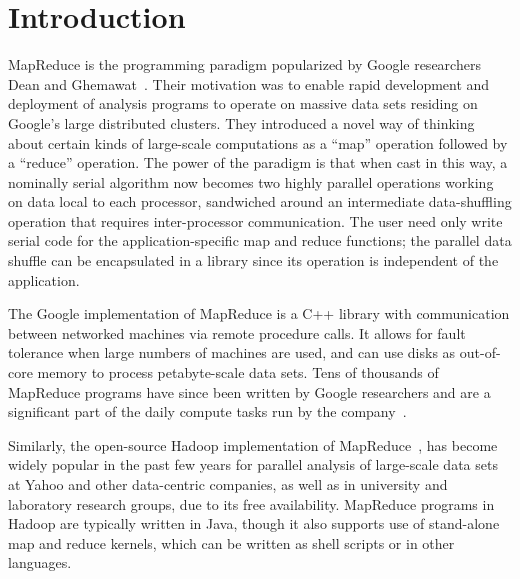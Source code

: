 \section{Introduction}
\label{sec:intro}

MapReduce is the programming paradigm popularized by Google
researchers Dean and Ghemawat~\cite{MapReduce2004}.  Their motivation was to
enable rapid development and deployment of analysis programs to
operate on massive data sets residing on Google's large distributed
clusters.  They introduced a novel way of thinking about certain kinds
of large-scale computations as a ``map'' operation followed by a
``reduce'' operation.  The power of the paradigm is that when cast in
this way, a nominally serial algorithm now becomes two highly parallel
operations working on data local to each processor, sandwiched around
an intermediate data-shuffling operation that requires inter-processor
communication.  The user need only write serial code for the
application-specific map and reduce functions; the parallel data
shuffle can be encapsulated in a library since its operation is
independent of the application.

The Google implementation of MapReduce is a C++ library with
communication between networked machines via remote procedure calls.
It allows for fault tolerance when large numbers of machines are used,
and can use disks as out-of-core memory to process petabyte-scale data
sets.  Tens of thousands of MapReduce programs have since been written
by Google researchers and are a significant part of the daily compute
tasks run by the company~\cite{MapReduce2008}.

Similarly, the open-source Hadoop implementation of MapReduce~\cite{Hadoop}, 
has become widely popular in the past few years for
parallel analysis of large-scale data sets at Yahoo and other
data-centric companies, as well as in university and laboratory
research groups, due to its free availability.  MapReduce programs in
Hadoop are typically written in Java, though it also supports use of
stand-alone map and reduce kernels, which can be written as shell
scripts or in other languages.

